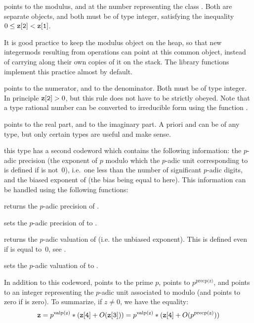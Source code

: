  points to the modulus, and  at the number representing
the class . Both are separate  objects, and both must be of
type integer, satisfying the inequality $0 \le {\tt z[2]} < {\tt z[1]}$.

It is good practice to keep the modulus object on the heap, so that new
integermods resulting from operations can point at this common object,
instead of carrying along their own copies of it on the stack. The library
functions implement this practice almost by default.

%
 points to the numerator, and  to the denominator. Both
must be of type integer. In principle ${\tt z[2]} > 0$, but this rule does not
have to be strictly obeyed. Note that a type  rational number can be
converted to irreducible form using the function .

%
 points to the real part, and  to the imaginary part. A
priori  and  can be of any type, but only certain types
are useful and make sense.

%
 this type has a second codeword
\kbd{[1]} which contains the following information: the $p$-adic precision
(the exponent of $p$ modulo which the $p$-adic unit corresponding to
 is defined if  is not~0), i.e.~one less than the number of
significant $p$-adic digits, and the biased exponent of  (the bias
being equal to  here). This information can be handled
using the following functions:

 returns the $p$-adic precision of .

 sets the $p$-adic precision of 
to .

 returns the $p$-adic valuation of  (i.e. the
unbiased exponent). This is defined even if  is equal to~0, see
.

 sets the $p$-adic valuation of 
to .

In addition to this codeword,  points to the prime $p$,
 points to $p^{\text{precp(z)}}$, and  points to an
integer representing the $p$-adic unit associated to  modulo
 (and points to zero if  is zero). To summarize, if $z\neq
0$, we have the equality:
$$ {\tt z} = p^{{\rm valp(z)}} * ({\tt z[4]} + O({\tt z[3]})) =
     p^{{\rm valp(z)}} * ({\tt z[4]} + O(p^{{\rm precp(z)}})) $$

